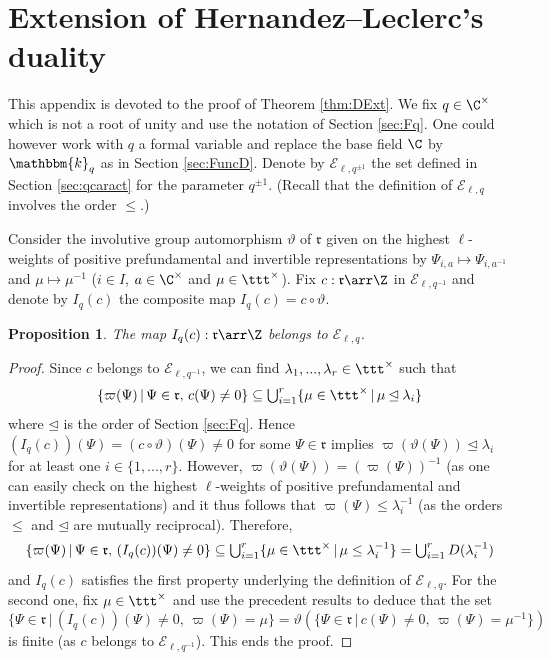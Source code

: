 \documentclass[11pt]{amsart}
\newtheorem{prop}[theorem]{Proposition}
\theoremstyle{definition}
\theoremstyle{remark}
\numberwithin{equation}{section}
\begin{document}
\section{Extension of Hernandez--Leclerc's duality}\label{app:K0D}
This appendix is devoted to the proof of Theorem \ref{thm:DExt}. We fix $q\in \C^{\times}$ which is not a root of unity and use the notation of Section \ref{sec:Fq}. One could however work with $q$ a formal variable and replace the base field $\C$ by $\mathbbm{k}_q$ as in Section \ref{sec:FuncD}. Denote by $\mathcal{E}_{\ell,q^{\pm 1}}$ the set defined in Section \ref{sec:qcaract} for the parameter $q^{\pm 1}$. (Recall that the definition of $\mathcal{E}_{\ell,q}$ involves the order $\leq$.)\par 
Consider the involutive group automorphism $\vartheta$ of $\mathfrak{r}$ given on the highest $\ell$-weights of positive prefundamental and invertible representations by $\Psi_{i,a}\mapsto \Psi_{i,a^{-1}}$ and $\mu \mapsto \mu^{-1}$ ($i\in I$, $a\in\C^{\times}$ and $\mu \in \ttt^{\times}$). Fix $c : \mathfrak{r}\arr \Z$ in $\mathcal{E}_{\ell,q^{-1}}$ and denote by $I_q(c)$ the composite map $I_q(c) = c\circ\vartheta$. 
\begin{prop} The map $I_q(c):\mathfrak{r}\arr \Z$ belongs to $\mathcal{E}_{\ell,q}$.
\end{prop}
\begin{proof}
Since $c$ belongs to $\mathcal{E}_{\ell,q^{-1}}$, we can find $\lambda_1,...,\lambda_r\in \ttt^{\times}$ such that $$\textstyle \{\varpi(\Psi)\,|\,\Psi\in\mathfrak{r},\, c(\Psi)\neq 0\}\subseteq \bigcup_{i=1}^r\{\mu\in\ttt^{\times}\,|\,\mu\unlhd\lambda_i\}$$
where $\unlhd$ is the order of Section \ref{sec:Fq}. Hence $(I_q(c))(\Psi)=(c\circ \vartheta)(\Psi)\neq 0$ for some $\Psi \in \mathfrak{r}$ implies $\varpi(\vartheta(\Psi)) \unlhd \lambda_i$ for at least one $i\in \{1,...,r\}$. However, $\varpi(\vartheta(\Psi))=(\varpi(\Psi))^{-1}$ (as one can easily check on the highest $\ell$-weights of positive prefundamental and invertible representations) and it thus follows that $\varpi(\Psi) \leq \lambda_i^{-1}$ (as the orders $\leq$ and $\unlhd$ are mutually reciprocal). Therefore,
$$ \textstyle \{\varpi(\Psi)\,|\,\Psi\in\mathfrak{r},\, (I_q(c))(\Psi)\neq 0\}\subseteq \bigcup_{i=1}^r\{\mu\in\ttt^{\times}\,|\,\mu\leq\lambda_i^{-1}\}=\bigcup_{i=1}^r D(\lambda_i^{-1}) $$
and $I_q(c)$ satisfies the first property underlying the definition of $\mathcal{E}_{\ell,q}$. For the second one, fix $\mu\in \ttt^{\times}$ and use the precedent results to deduce that the set
$$ \textstyle \{\Psi\in \mathfrak{r}\,|\,(I_q(c))(\Psi)\neq 0,\, \varpi(\Psi) = \mu\} = \vartheta(\{\Psi\in\mathfrak{r}\,|\, c(\Psi)\neq 0, \, \varpi(\Psi)=\mu^{-1} \})$$
is finite (as $c$ belongs to $\mathcal{E}_{\ell,q^{-1}}$). This ends the proof.
\end{proof} 
\end{document}
